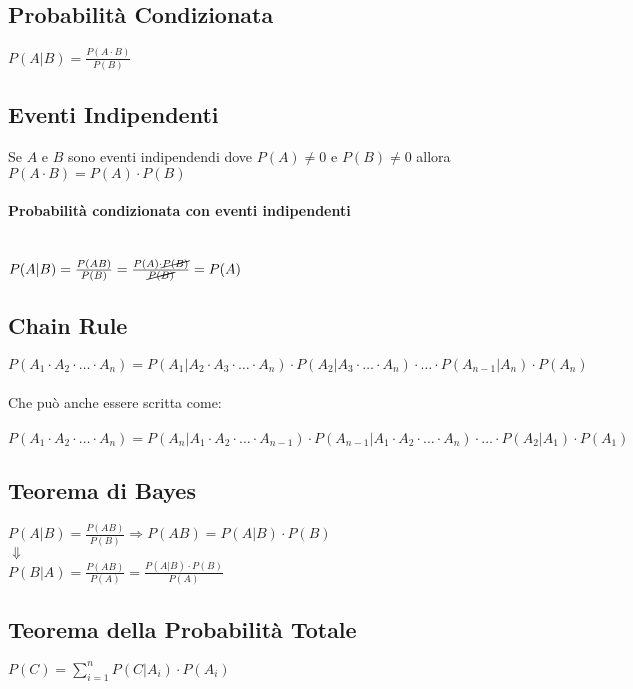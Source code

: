 \documentclass{article}
\begin{document}
\subsection{Probabilità Condizionata}
$P(A|B) = \frac{P(A \cdot B)}{P(B)}$

\subsection{Eventi Indipendenti}
Se $A$ e $B$ sono eventi indipendendi dove $P(A) \neq 0$ e $P(B) \neq 0$ allora \\
$P(A \cdot B) = P(A) \cdot P(B)$

\paragraph{Probabilità condizionata con eventi indipendenti} ~\\
$P(A|B) = \frac{P(AB)}{P(B)} = \frac{P(A) \cdot \cancel{P(B)}}{\cancel{P(B)}} = P(A)$

\subsection{Chain Rule}
$P(A_1 \cdot A_2 \cdot \dots \cdot A_n) = P(A_1|A_2 \cdot A_3 \cdot \dots \cdot A_n) \cdot P(A_2|A_3 \cdot \dots \cdot A_n) \cdot \dots \cdot P(A_{n-1}| A_n) \cdot P(A_n)$ \\ \\
Che può anche essere scritta come: \\ \\
$P(A_1 \cdot A_2 \cdot \dots \cdot A_n) = P(A_n|A_1 \cdot A_2 \cdot \dots \cdot A_{n-1}) \cdot P(A_{n-1}|A_1 \cdot A_2 \cdot \dots \cdot A_n) \cdot \dots \cdot P(A_2| A_1) \cdot P(A_1)$

\subsection{Teorema di Bayes}
$P(A|B) = \frac{P(AB)}{P(B)} \Rightarrow P(AB) = P(A|B) \cdot P(B)$ \\
$\Downarrow$ \\
$P(B|A) = \frac{P(AB)}{P(A)} = \frac{P(A|B) \cdot P(B)}{P(A)}$

\subsection{Teorema della Probabilità Totale}
$P(C) = \sum_{i=1}^{n} P(C|A_i) \cdot P(A_i)$
\end{document}
